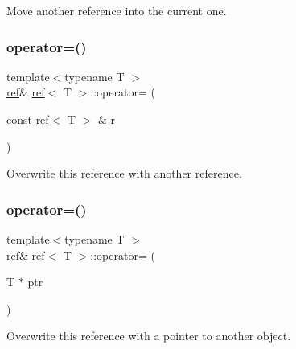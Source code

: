 Move another reference into the current one. 

\mbox{\label{classref_a1155f824011414922d9b6a3b5d90c8d8}} 
\subsubsection{\texorpdfstring{operator=()}{operator=()}\hspace{0.1cm}{\footnotesize\ttfamily [2/3]}}
{\footnotesize\ttfamily template$<$typename T $>$ \\
\mbox{\hyperlink{classref}{ref}}\& \mbox{\hyperlink{classref}{ref}}$<$ T $>$\+::operator= (\begin{DoxyParamCaption}\item[{const \mbox{\hyperlink{classref}{ref}}$<$ T $>$ \&}]{r }\end{DoxyParamCaption})\hspace{0.3cm}{\ttfamily [inline]}}



Overwrite this reference with another reference. 

\mbox{\label{classref_a16ebd4ab3890e76d47cf7ef30f338690}} 
\subsubsection{\texorpdfstring{operator=()}{operator=()}\hspace{0.1cm}{\footnotesize\ttfamily [3/3]}}
{\footnotesize\ttfamily template$<$typename T $>$ \\
\mbox{\hyperlink{classref}{ref}}\& \mbox{\hyperlink{classref}{ref}}$<$ T $>$\+::operator= (\begin{DoxyParamCaption}\item[{T $\ast$}]{ptr }\end{DoxyParamCaption})\hspace{0.3cm}{\ttfamily [inline]}}



Overwrite this reference with a pointer to another object. 

\mbox{\label{classref_a8a96aae6d9787e988ff148d1dd9a773d}} 
